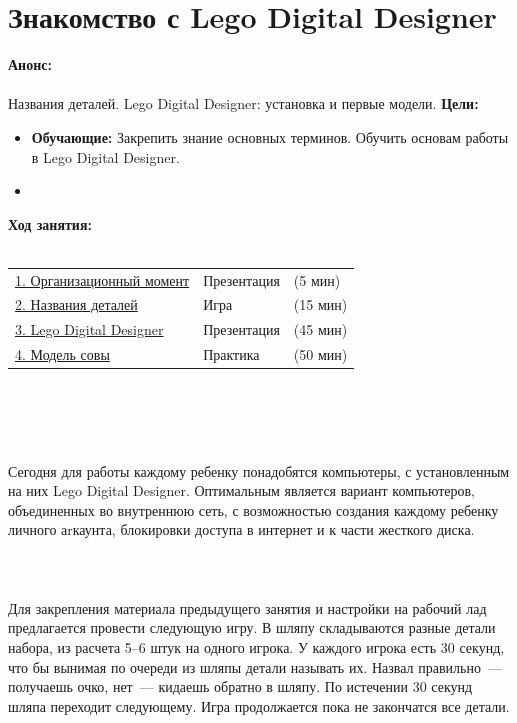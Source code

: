 \chapter{Знакомство с Lego Digital Designer}
{\bfseries Анонс:}\\\\
Названия деталей. Lego Digital Designer: установка и первые модели.
{\bfseries Цели:}
\begin{itemize}
	\item{}{\bfseries Обучающие:} Закрепить  знание основных терминов. Обучить основам работы в Lego Digital Designer. 
	\item{}{\bfseries {}} \\
\end{itemize}	
{\bfseries Ход занятия:}\\\\
\begin{tabular}{lll}
	\hyperlink{lesson3x1}{1. Организационный момент} & Презентация & (5 мин)\\
	\hyperlink{lesson3x2}{2. Названия деталей} & Игра & (15 мин) \\
	\hyperlink{lesson3x3}{3. Lego Digital Designer} & Презентация & (45 мин) \\
	\hyperlink{lesson3x4}{4. Модель совы} & Практика & (50 мин)\\
\end{tabular}\\\\

{\hypertarget{lesson3x1}{}}\\\\

Сегодня для работы каждому ребенку понадобятся компьютеры, с установленным на них Lego Digital Designer. Оптимальным является вариант компьютеров, объединенных во внутреннюю сеть, с возможностью создания каждому ребенку личного аrкаунта, блокировки доступа в интернет и к части жесткого диска.\\\\

{\hypertarget{lesson3x2}{}}\\\\

Для закрепления материала предыдущего занятия и настройки на рабочий лад предлагается провести следующую игру. В шляпу складываются разные детали набора, из расчета 5--6 штук на одного игрока. У каждого игрока есть 30 секунд, что бы вынимая по очереди из шляпы детали называть их. Назвал правильно~--- получаешь очко, нет~--- кидаешь обратно в шляпу. По истечении 30 секунд шляпа переходит следующему. Игра продолжается пока не закончатся все детали.\\\\

